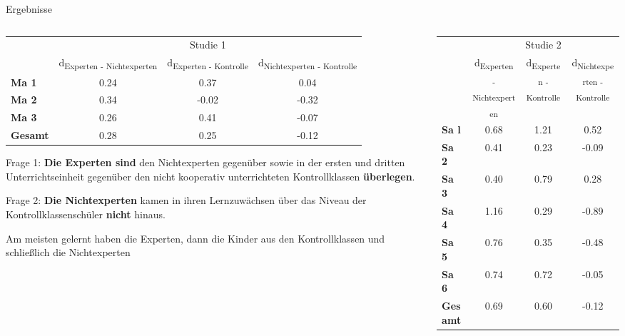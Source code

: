 \begin{alertblock}{Ergebnisse} %
\begin{columns}[t,totalwidth=\twocolwid] %

\begin{column}{\onecolwid}
\begin{table}
\begin{tabular}{lccc}
 & \multicolumn{3}{c}{Studie 1} \\
\cmidrule{2-4}
 & d\textsubscript{Experten - Nichtexperten} & d\textsubscript{Experten - Kontrolle} & d\textsubscript{Nichtexperten - Kontrolle} \\
\midrule 
\textbf{Ma 1} & 0.24 & 0.37 & 0.04 \\
\textbf{Ma 2} & 0.34 & -0.02 & -0.32 \\
\textbf{Ma 3} & 0.26 & 0.41 & -0.07 \\
\midrule 
\textbf{Gesamt} & 0.28 & 0.25 & -0.12 \\
\bottomrule
\end{tabular}
\end{table}

\justifying 
Frage 1: \textbf{Die Experten sind} den Nichtexperten gegenüber sowie in der ersten und dritten Unterrichtseinheit gegenüber den nicht kooperativ unterrichteten Kontrollklassen \textbf{überlegen}.
 
Frage 2: \textbf{Die Nichtexperten} kamen in ihren Lernzuwächsen über das Niveau der Kontrollklassenschüler \textbf{nicht} hinaus.

\bigskip
Am meisten gelernt haben die Experten, dann die Kinder aus den Kontrollklassen und schließlich die Nichtexperten
 
\end{column}

\begin{column}{\onecolwid}
\begin{table}
\begin{tabular}{lccc}
 & \multicolumn{3}{c}{Studie 2} \\
\cmidrule{2-4}
 & d\textsubscript{Experten - Nichtexperten} & d\textsubscript{Experten - Kontrolle} & d\textsubscript{Nichtexperten - Kontrolle} \\
\midrule 
\textbf{Sa l} & 0.68 & 1.21 & 0.52 \\
\textbf{Sa 2} & 0.41 & 0.23 & -0.09 \\
\textbf{Sa 3} & 0.40 & 0.79 & 0.28 \\
\textbf{Sa 4} & 1.16 & 0.29 & -0.89 \\
\textbf{Sa 5} & 0.76 & 0.35 & -0.48 \\
\textbf{Sa 6} & 0.74 & 0.72 & -0.05 \\
\midrule 
\textbf{Gesamt} & 0.69 & 0.60 & -0.12 \\
\bottomrule
\end{tabular} 
\end{table}


\end{column}
\end{columns}
\end{alertblock}

